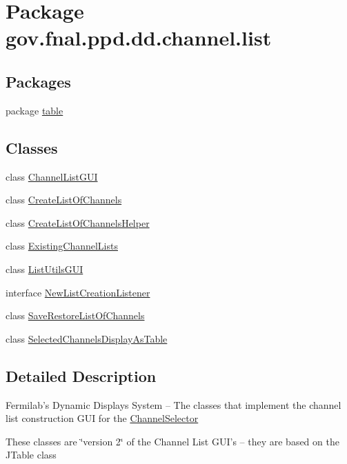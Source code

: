 \hypertarget{namespacegov_1_1fnal_1_1ppd_1_1dd_1_1channel_1_1list}{\section{Package gov.\-fnal.\-ppd.\-dd.\-channel.\-list}
\label{namespacegov_1_1fnal_1_1ppd_1_1dd_1_1channel_1_1list}
}
\subsection*{Packages}
\begin{DoxyCompactItemize}
\item 
package \hyperlink{namespacegov_1_1fnal_1_1ppd_1_1dd_1_1channel_1_1list_1_1table}{table}
\end{DoxyCompactItemize}
\subsection*{Classes}
\begin{DoxyCompactItemize}
\item 
class \hyperlink{classgov_1_1fnal_1_1ppd_1_1dd_1_1channel_1_1list_1_1ChannelListGUI}{Channel\-List\-G\-U\-I}
\item 
class \hyperlink{classgov_1_1fnal_1_1ppd_1_1dd_1_1channel_1_1list_1_1CreateListOfChannels}{Create\-List\-Of\-Channels}
\item 
class \hyperlink{classgov_1_1fnal_1_1ppd_1_1dd_1_1channel_1_1list_1_1CreateListOfChannelsHelper}{Create\-List\-Of\-Channels\-Helper}
\item 
class \hyperlink{classgov_1_1fnal_1_1ppd_1_1dd_1_1channel_1_1list_1_1ExistingChannelLists}{Existing\-Channel\-Lists}
\item 
class \hyperlink{classgov_1_1fnal_1_1ppd_1_1dd_1_1channel_1_1list_1_1ListUtilsGUI}{List\-Utils\-G\-U\-I}
\item 
interface \hyperlink{interfacegov_1_1fnal_1_1ppd_1_1dd_1_1channel_1_1list_1_1NewListCreationListener}{New\-List\-Creation\-Listener}
\item 
class \hyperlink{classgov_1_1fnal_1_1ppd_1_1dd_1_1channel_1_1list_1_1SaveRestoreListOfChannels}{Save\-Restore\-List\-Of\-Channels}
\item 
class \hyperlink{classgov_1_1fnal_1_1ppd_1_1dd_1_1channel_1_1list_1_1SelectedChannelsDisplayAsTable}{Selected\-Channels\-Display\-As\-Table}
\end{DoxyCompactItemize}


\subsection{Detailed Description}
Fermilab's Dynamic Displays System -- The classes that implement the channel list construction G\-U\-I for the \hyperlink{classgov_1_1fnal_1_1ppd_1_1dd_1_1ChannelSelector}{Channel\-Selector}

These classes are \char`\"{}version 2\char`\"{} of the Channel List G\-U\-I's -- they are based on the J\-Table class